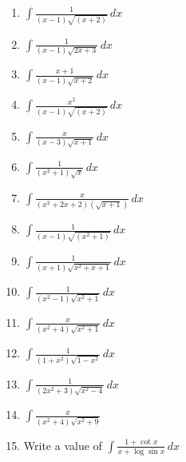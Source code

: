 \documentclass[18pt]{article}
\newcommand{\ds}{\displaystyle \int}
\begin{document}
	\begin{enumerate}
		
		\item $\ds \frac{1}{(x-1)\sqrt{(x+2)}}\,dx$
		
		\item $\ds \frac{1}{(x-1)\sqrt{2x+3}}\,dx$
		
		\item $\ds \frac{x+1}{(x-1) \sqrt{x+2}}\,dx$
		
		\item $\ds \frac{x^2}{(x-1) \sqrt{(x+2)}}\,dx$
		
		\item $\ds \frac{x}{(x-3)\sqrt{x+1}}\,dx$
		
		\item $\ds \frac{1}{(x^2+1)\sqrt{x}}\,dx $
		
		\item $\ds \frac{x}{(x^2+2x+2)(\sqrt{x+1})}\,dx$
		
		\item $\ds \frac{1}{(x-1)\sqrt{(x^2+1)}}\,dx$
		
		\item $\ds \frac{1}{(x+1)\sqrt{x^2+x+1}}\,dx$
		
		\item $\ds \frac{1}{(x^2-1)\sqrt{x^2+1}}\,dx$
		
		\item $\ds \frac{x}{(x^2+4)\sqrt{x^2+1}}\,dx$
		
		\item $\ds \frac{1}{(1+x^2)\sqrt{1-x^2}}\,dx$
		
		\item $\ds \frac{1}{(2x^2+3) \sqrt{x^2-4}}\,dx$
		
		\item $\ds \frac{x}{(x^2+4)\sqrt{x^2+9}}$
		
		\item Write a value of $\ds \frac{1+\cot x}{x+\log \sin x}\,dx$
	\end{enumerate}	
\end{document}
